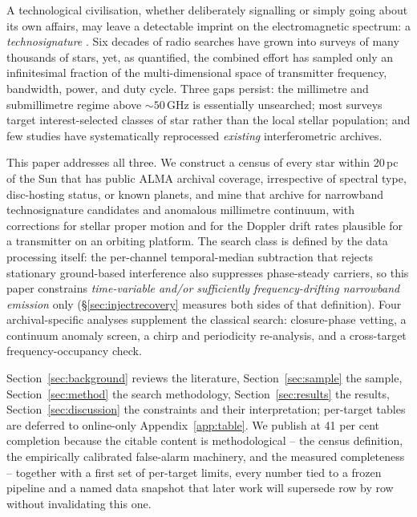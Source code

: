 \documentclass{openjournal}
\begin{document}
A technological civilisation, whether deliberately signalling or simply
going about its own affairs, may leave a detectable imprint on the
electromagnetic spectrum: a \emph{technosignature}
\citep{Sheikh2020,SETIreview2025}. Six decades of radio searches have
grown into surveys of many thousands of stars, yet, as
\citet{Wright2018} quantified, the combined effort has sampled only an
infinitesimal fraction of the multi-dimensional space of transmitter
frequency, bandwidth, power, and duty cycle. Three gaps persist: the
millimetre and submillimetre regime above ${\sim}50$\,GHz is
essentially unsearched; most surveys target interest-selected classes
of star rather than the local stellar population; and few studies have
systematically reprocessed \emph{existing} interferometric archives.

This paper addresses all three. We construct a census of every star
within 20\,pc of the Sun that has public ALMA archival coverage,
irrespective of spectral type, disc-hosting status, or known planets,
and mine that archive for narrowband technosignature candidates and
anomalous millimetre continuum, with corrections for stellar proper
motion and for the Doppler drift rates plausible for a transmitter on
an orbiting platform. The search class is defined by the data
processing itself: the per-channel temporal-median subtraction that
rejects stationary ground-based interference also suppresses
phase-steady carriers, so this paper constrains \emph{time-variable
and/or sufficiently frequency-drifting narrowband emission} only
(\S\ref{sec:injectrecovery} measures both sides of that definition).
Four archival-specific analyses supplement the classical search:
closure-phase vetting, a continuum anomaly screen, a chirp and
periodicity re-analysis, and a cross-target frequency-occupancy check.

Section~\ref{sec:background} reviews the literature,
Section~\ref{sec:sample} the sample, Section~\ref{sec:method} the
search methodology, Section~\ref{sec:results} the results,
Section~\ref{sec:discussion} the constraints and their interpretation;
per-target tables are deferred to online-only Appendix~\ref{app:table}.
We publish at 41 per cent completion because the citable content is
methodological -- the census definition, the empirically calibrated
false-alarm machinery, and the measured completeness -- together with
a first set of per-target limits, every number tied to a frozen
pipeline and a named data snapshot that later work will supersede row
by row without invalidating this one.
\end{document}
